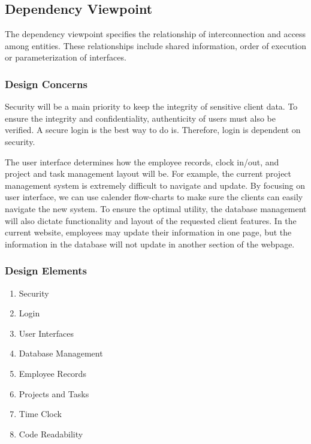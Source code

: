 \documentclass[letterpaper,10pt,titlepage,journal,compsoc,draftclsnofoot,onecolumn]{IEEEtran}
\newcommand\tab[1][1cm]{\hspace*{#1}}
\begin{document}
\subsection{Dependency Viewpoint}

\tab The dependency viewpoint specifies the relationship of interconnection and access among entities. These relationships include shared information, order of execution or parameterization of interfaces.

\subsubsection{Design Concerns}

\tab
Security will be a main priority to keep the integrity of sensitive client data. To ensure the integrity and confidentiality, authenticity of users must also be verified. A secure login is the best way to do is. Therefore, login is dependent on security.\newline


\tab
The user interface determines how the employee records, clock in/out, and project and task management layout will be. For example, the current project management system is extremely difficult to navigate and update. By focusing on user interface, we can use calender flow-charts to make sure the clients can easily navigate the new system. To ensure the optimal utility, the database management will also dictate functionality and layout of the requested client features. In the current website, employees may update their information in one page, but the information in the database will not update in another section of the webpage. 

\subsubsection{Design Elements}

\begin{enumerate}
\item{Security}
\item{Login}
\item{User Interfaces}
\item{Database Management}
\item{Employee Records}
\item{Projects and Tasks}
\item{Time Clock}
\item{Code Readability}
\end{enumerate}
\end{document}

